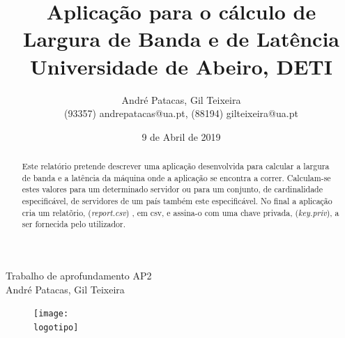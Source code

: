 \documentclass{report}
\begin{document}
%

\def\titulo{Trabalho de aprofundamento AP2}
\def\data{9 de Abril de 2019}
\def\autores{André Patacas, Gil Teixeira}
\def\autorescontactos{(93357) andrepatacas@ua.pt, (88194) gilteixeira@ua.pt}
\def\departamento{Universidade de Abeiro, DETI}
\def\logotipo{ua.pdf}
%
%
\begin{titlepage}

\begin{center}
%
\vspace*{50mm}
%
{\Huge \titulo}\\ 
%
\vspace{10mm}
%
{\LARGE \autores}\\ 
%
\vspace{30mm}
%
\begin{figure}[h]
\center
\texttt{[image: \\logotipo]}
\end{figure}
%
\vspace{30mm}
\end{center}
%
\begin{flushright}

\end{flushright}
\end{titlepage}

\title{%
{\Huge\textbf{Aplicação para o cálculo de Largura de Banda e de Latência}}\\
{\Large \departamento}
}
%
\author{%
    \autores \\
    \autorescontactos 
}

%
\date{\data}
%
\maketitle






\tableofcontents


\clearpage
{}

\begin{abstract}
Este relatório pretende descrever uma aplicação desenvolvida para calcular a largura de banda e a latência da máquina onde a aplicação se encontra a correr. Calculam-se estes valores para um determinado servidor ou para um conjunto, de cardinalidade especificável, de servidores de um país também este especificável. No final a aplicação cria um relatõrio, (\textit{report.csv}) , em csv, e assina-o com uma chave privada, (\textit{key.priv}), a ser fornecida pelo utilizador.

\end{abstract}
\end{document}
